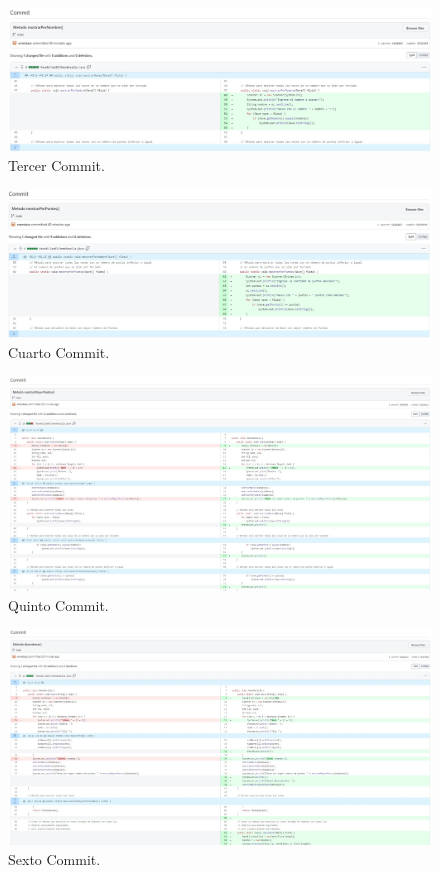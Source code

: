 \documentclass{article}
\begin{document}
\begin{figure}[H]
	\centering
	\includegraphics[width=1\textwidth,keepaspectratio]{img/commit03.jpg}
	\caption{Tercer Commit.}
\end{figure}
\begin{figure}[H]
	\centering
	\includegraphics[width=1\textwidth,keepaspectratio]{img/commit04.jpg}
	\caption{Cuarto Commit.}
\end{figure}
\begin{figure}[H]
	\centering
	\includegraphics[width=1\textwidth,keepaspectratio]{img/commit05.jpg}
	\caption{Quinto Commit.}
\end{figure}
\begin{figure}[H]
	\centering
	\includegraphics[width=1\textwidth,keepaspectratio]{img/commit06.jpg}
	\caption{Sexto Commit.}
\end{figure}
\end{document}

